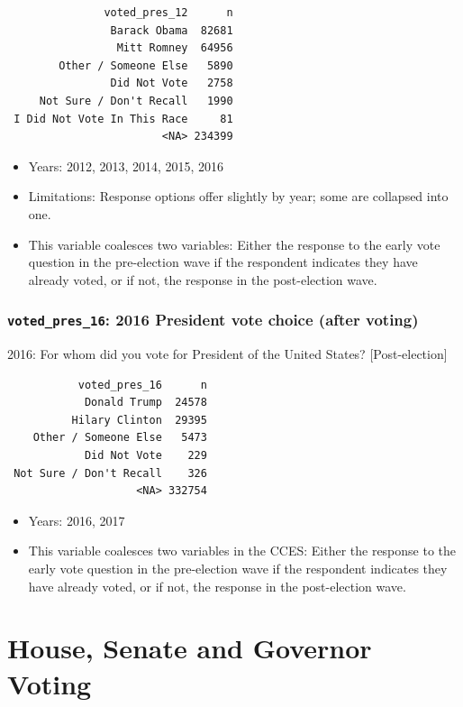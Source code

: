 \documentclass[10pt,article,oneside]{memoir}
\theoremstyle{definition}
\begin{document}
\begin{verbatim}
               voted_pres_12      n
                Barack Obama  82681
                 Mitt Romney  64956
        Other / Someone Else   5890
                Did Not Vote   2758
     Not Sure / Don't Recall   1990
 I Did Not Vote In This Race     81
                        <NA> 234399
\end{verbatim}

\begin{itemize}
\tightlist
\item
  Years: 2012, 2013, 2014, 2015, 2016
\item
  Limitations: Response options offer slightly by year; some are
  collapsed into one.
\item
  This variable coalesces two variables: Either the response to the
  early vote question in the pre-election wave if the respondent
  indicates they have already voted, or if not, the response in the
  post-election wave.
\end{itemize}

\subsubsection{\texorpdfstring{\texttt{voted\_pres\_16}: 2016 President
vote choice (after
voting)}{voted\_pres\_16: 2016 President vote choice (after voting)}}\label{voted_pres_16-2016-president-vote-choice-after-voting}

2016: For whom did you vote for President of the United States?
{[}Post-election{]}

\begin{verbatim}
           voted_pres_16      n
            Donald Trump  24578
          Hilary Clinton  29395
    Other / Someone Else   5473
            Did Not Vote    229
 Not Sure / Don't Recall    326
                    <NA> 332754
\end{verbatim}

\begin{itemize}
\tightlist
\item
  Years: 2016, 2017
\item
  This variable coalesces two variables in the CCES: Either the response
  to the early vote question in the pre-election wave if the respondent
  indicates they have already voted, or if not, the response in the
  post-election wave.
\end{itemize}

\section{House, Senate and Governor
Voting}\label{house-senate-and-governor-voting}
\end{document}
